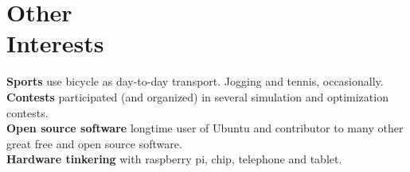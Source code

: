 		\section{Other \\Interests} 

   \textbf{Sports} use bicycle as day-to-day transport. Jogging and tennis, occasionally. \\
   \textbf{Contests} participated (and organized) in several simulation and optimization contests. \\
   \textbf{Open source software} longtime user of Ubuntu and contributor to many other great free and open source software.\\
   \textbf{Hardware tinkering} with raspberry pi, chip, telephone and tablet.
	